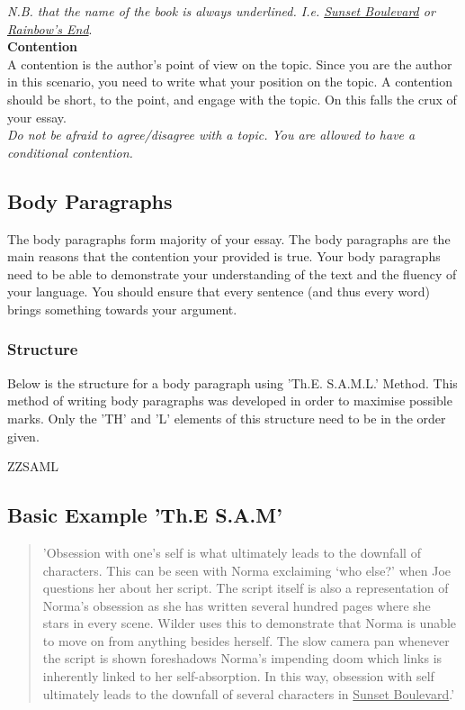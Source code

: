 \documentclass[a4paper]{article}
\begin{document}
\textit{N.B. that the name of the book is always underlined.
I.e. \underline{Sunset Boulevard} or \underline{Rainbow's End}}.\\

\textbf{Contention}\\
A contention is the author's point of view on the topic. Since you are the author in this scenario, you need to write what your position on the topic. A contention should be short, to the point, and engage with the topic. On this falls the crux of your essay.\\

\textit{Do not be afraid to agree/disagree with a topic. You are allowed to have a conditional contention.}\\

\newpage
\subsection{Body Paragraphs}
The body paragraphs form majority of your essay. The body paragraphs are the main reasons that the contention your provided is true. Your body paragraphs need to be able to demonstrate your understanding of the text and the fluency of your language. You should ensure that every sentence (and thus every word) brings something towards your argument.

\subsubsection{Structure}
Below is the structure for a body paragraph using 'Th.E. S.A.M.L.' Method. This method of writing body paragraphs was developed in order to maximise possible marks. Only the 'TH' and 'L' elements of this structure need to be in the order given.



ZZSAML



\subsection{Basic Example 'Th.E S.A.M'}
\begin{quote}
   'Obsession with one’s self is what ultimately leads to the downfall of characters. This can be seen with Norma exclaiming ‘who else?’ when Joe questions her about her script. The script itself is also a representation of Norma’s obsession as she has written several hundred pages where she stars in every scene. Wilder uses this to demonstrate that Norma is unable to move on from anything besides herself. The slow camera pan whenever the script is shown foreshadows Norma’s impending doom which links is inherently linked to her self-absorption. In this way, obsession with self ultimately leads to the downfall of several characters in \underline{Sunset Boulevard}.'

\end{quote}
\end{document}
